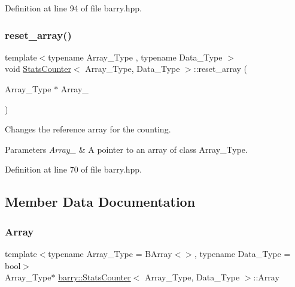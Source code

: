 Definition at line 94 of file barry.\+hpp.

\mbox{\label{classbarry_1_1_stats_counter_a38fd8037c34dff376d2e5fb013690642}} 
\subsubsection{\texorpdfstring{reset\+\_\+array()}{reset\_array()}}
{\footnotesize\ttfamily template$<$typename Array\+\_\+\+Type , typename Data\+\_\+\+Type $>$ \\
void \hyperlink{classbarry_1_1_stats_counter}{Stats\+Counter}$<$ Array\+\_\+\+Type, Data\+\_\+\+Type $>$\+::reset\+\_\+array (\begin{DoxyParamCaption}\item[{Array\+\_\+\+Type $\ast$}]{Array\+\_\+ }\end{DoxyParamCaption})\hspace{0.3cm}{\ttfamily [inline]}}



Changes the reference array for the counting. 


\begin{DoxyParams}{Parameters}
{\em Array\+\_\+} & A pointer to an array of class {\ttfamily Array\+\_\+\+Type}. \\
\hline
\end{DoxyParams}


Definition at line 70 of file barry.\+hpp.



\subsection{Member Data Documentation}
\mbox{\label{classbarry_1_1_stats_counter_aaf5a82fc09c8ffd2517b1a69680da10d}} 
\subsubsection{\texorpdfstring{Array}{Array}}
{\footnotesize\ttfamily template$<$typename Array\+\_\+\+Type  = B\+Array$<$$>$, typename Data\+\_\+\+Type  = bool$>$ \\
Array\+\_\+\+Type$\ast$ \hyperlink{classbarry_1_1_stats_counter}{barry\+::\+Stats\+Counter}$<$ Array\+\_\+\+Type, Data\+\_\+\+Type $>$\+::Array}



